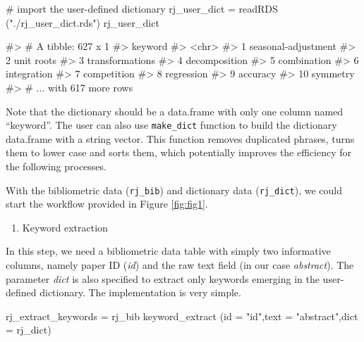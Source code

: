 \begin{Schunk}
\begin{Sinput}
# import the user-defined dictionary
rj_user_dict = readRDS ("./rj_user_dict.rds")
rj_user_dict
\end{Sinput}
\begin{Soutput}
#> # A tibble: 627 x 1
#>    keyword            
#>    <chr>              
#>  1 seasonal-adjustment
#>  2 unit roots         
#>  3 transformations    
#>  4 decomposition      
#>  5 combination        
#>  6 integration        
#>  7 competition        
#>  8 regression         
#>  9 accuracy           
#> 10 symmetry           
#> # ... with 617 more rows
\end{Soutput}
\end{Schunk}

Note that the dictionary should be a data.frame with only one column
named ``keyword''. The user can also use \texttt{make\_dict} function to
build the dictionary data.frame with a string vector. This function
removes duplicated phrases, turns them to lower case and sorts them,
which potentially improves the efficiency for the following processes.

\begin{Schunk}
\end{Schunk}

With the bibliometric data (\texttt{rj\_bib}) and dictionary data
(\texttt{rj\_dict}), we could start the workflow provided in Figure
\ref{fig:fig1}.

\begin{enumerate}
\def\labelenumi{(\arabic{enumi})}
\tightlist
\item
  Keyword extraction
\end{enumerate}

In this step, we need a bibliometric data table with simply two
informative columns, namely paper ID (\emph{id}) and the raw text field
(in our case \emph{abstract}). The parameter \emph{dict} is also
specified to extract only keywords emerging in the user-defined
dictionary. The implementation is very simple.

\begin{Schunk}
\begin{Sinput}
rj_extract_keywords = rj_bib %
  keyword_extract (id = "id",text = "abstract",dict = rj_dict)
\end{Sinput}
\end{Schunk}

